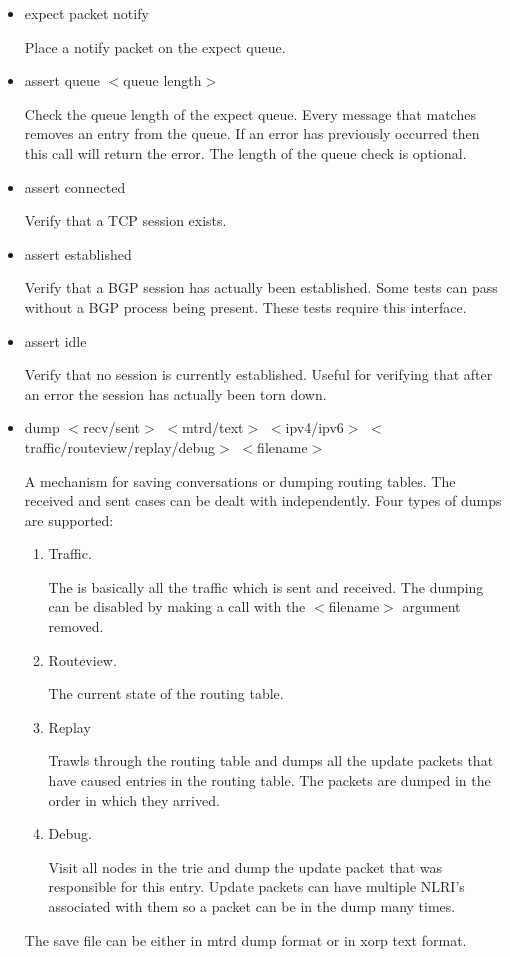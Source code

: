 \documentclass[11pt]{article}
\begin{document}
\begin{itemize}
\item {\sf expect packet notify}

  Place a notify packet on the expect queue.

\item {\sf assert queue $<$queue length$>$}

  Check the queue length of the expect queue. Every message that
  matches removes an entry from the queue. If an error has previously
  occurred then this call will return the error. The length of the
  queue check is optional.

\item {\sf assert connected}

  Verify that a TCP session exists.

\item {\sf assert established}

  Verify that a BGP session has actually been established. Some tests can pass
  without a BGP process being present. These tests require this interface.

\item {\sf assert idle}

  Verify that no session is currently established. Useful for
  verifying that after an error the session has actually been torn down.

\item {\sf dump $<$recv/sent$>$ $<$mtrd/text$>$ $<$ipv4/ipv6$>$ $<$traffic/routeview/replay/debug$>$ $<$filename$>$}

  A mechanism for saving conversations or dumping routing tables. The
  received and sent cases can be dealt with independently. Four types
  of dumps are supported:

  \begin{enumerate}

        \item Traffic.

        The is basically all the traffic which is sent and
        received. The dumping can be disabled by making a call with
        the $<$filename$>$ argument removed.

        \item Routeview.

        The current state of the routing table.

        \item Replay

        Trawls through the routing table and dumps all the update
        packets that have caused entries in the routing table. The
        packets are dumped in the order in which they arrived.

        \item Debug.

        Visit all nodes in the trie and dump the update packet that
        was responsible for this entry. Update packets can have
        multiple NLRI's associated with them so a packet can be in the
        dump many times.

      \end{enumerate}

  The save file can be either in mtrd dump format or in xorp text format.

\end{itemize}
\end{document}
